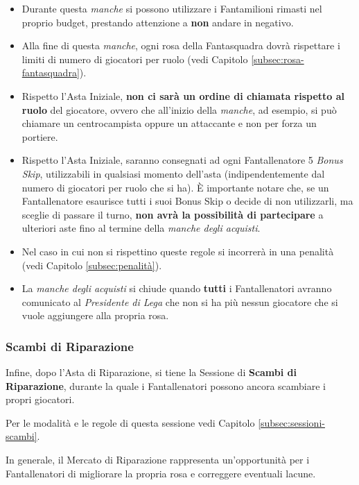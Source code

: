 \documentclass[12pt]{article}
\begin{document}
\begin{enumerate}
    \begin{itemize}
        \item Durante questa \textit{manche} si possono utilizzare i Fantamilioni rimasti nel proprio budget, prestando attenzione a \textbf{non} andare in negativo.
        \item Alla fine di questa \textit{manche}, ogni rosa della Fantasquadra dovrà rispettare i limiti di numero di giocatori per ruolo (vedi Capitolo \ref{subsec:rosa-fantasquadra}).
        \item Rispetto l'Asta Iniziale, \textbf{non ci sarà un ordine di chiamata rispetto al ruolo} del giocatore, ovvero che all’inizio della \textit{manche}, ad esempio, si può chiamare un centrocampista oppure un attaccante e non per forza un portiere.
        \item Rispetto l'Asta Iniziale, saranno consegnati ad ogni Fantallenatore 5 \textit{Bonus Skip}, utilizzabili in qualsiasi momento dell'asta (indipendentemente dal numero di giocatori per ruolo che si ha).
    È importante notare che, se un Fantallenatore esaurisce tutti i suoi Bonus Skip o decide di non utilizzarli, ma sceglie di passare il turno, \textbf{non avrà la possibilità di partecipare} a ulteriori aste fino al termine della \textit{manche degli acquisti}.
        \item Nel caso in cui non si rispettino queste regole si incorrerà in una penalità (vedi Capitolo \ref{subsec:penalità}).
        \item La \textit{manche degli acquisti} si chiude quando \textbf{tutti} i Fantallenatori avranno comunicato al \textit{Presidente di Lega} che non si ha più nessun giocatore che si vuole aggiungere alla propria rosa.
    \end{itemize}
\end{enumerate}

\subsubsection{Scambi di Riparazione}
Infine, dopo l'Asta di Riparazione, si tiene la Sessione di \textbf{Scambi di Riparazione}, durante la quale i Fantallenatori possono ancora scambiare i propri giocatori. \par Per le modalità e le regole di questa sessione vedi Capitolo \ref{subsec:sessioni-scambi}.

\vspace{10pt}

In generale, il Mercato di Riparazione rappresenta un'opportunità per i Fantallenatori di migliorare la propria rosa e correggere eventuali lacune.
\end{document}
